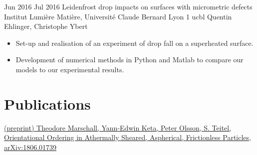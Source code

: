 \documentclass[letterpaper]{cvtemplate} %
\begin{document}
\begin{cvbody}
\cvitem
	{Jun 2016}
	{Jul 2016}
	{Leidenfrost drop impacts on surfaces with micrometric defects}
	{Institut Lumi\`ere Mati\`ere, Universit\'e Claude Bernard Lyon 1 }
	{ucbl}
	{Quentin Ehlinger, Christophe Ybert}
	{\begin{itemize}
	\item Set-up and realisation of an experiment of drop fall on a superheated surface.
	\item Development of numerical methods in Python and Matlab to compare our models to
our experimental results.
	\end{itemize}
	}
        
\end{cvbody}


\section{Publications}
\href{https://arxiv.org/abs/1806.01739}{{\small (preprint)} Theodore Marschall, Yann-Edwin Keta, Peter Olsson, S. Teitel, Orientational Ordering in Athermally Sheared, Aspherical, Frictionless Particles, arXiv:1806.01739}

\end{document}
